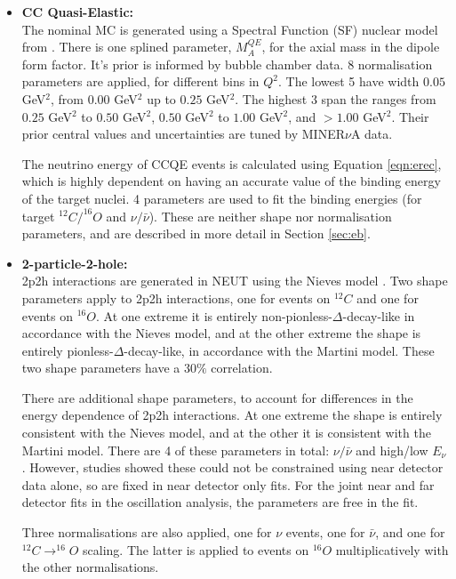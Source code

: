\begin{itemize}

\item \textbf{CC Quasi-Elastic:}\\
The nominal MC is generated using a Spectral Function (SF) nuclear model from \cite{benhar}. There is one splined parameter, $M^{QE}_{A}$, for the axial mass in the dipole form factor. It's prior is informed by bubble chamber data\cite{tn344}. 8 normalisation parameters are applied, for different bins in $Q^2$. The lowest 5 have width $0.05$ GeV$^2$, from $0.00$ GeV$^2$ up to $0.25$ GeV$^2$. The highest 3 span the ranges from $0.25$ GeV$^2$ to $0.50$ GeV$^2$, $0.50$ GeV$^2$ to $1.00$ GeV$^2$, and $>1.00$ GeV$^2$. Their prior central values and uncertainties are tuned by MINER$\nu$A data. 

The neutrino energy of CCQE events is calculated using Equation \ref{eqn:erec}, which is highly dependent on having an accurate value of the binding energy of the target nuclei. 4 parameters are used to fit the binding energies (for target $^{12}C/^{16}O$ and $\nu/\bar{\nu}$). These are neither shape nor normalisation parameters, and are described in more detail in Section \ref{sec:eb}.

\item \textbf{2-particle-2-hole:}\\
2p2h interactions are generated in NEUT using the Nieves model \cite{Nieves}. Two shape parameters apply to 2p2h interactions, one for events on $^{12}C$ and one for events on $^{16}O$.  At one extreme it is entirely non-pionless-$\Delta$-decay-like in accordance with the Nieves model, and at the other extreme the shape is entirely pionless-$\Delta$-decay-like, in accordance with the Martini model\cite{Martini}. These two shape parameters have a 30$\%$ correlation.

There are additional shape parameters, to account for differences in the energy dependence of 2p2h interactions. At one extreme the shape is entirely consistent with the Nieves model, and at the other it is consistent with the Martini model. There are 4 of these parameters in total: $\nu/\bar{\nu}$ and high/low $E_{\nu}$. However, studies showed these could not be constrained using near detector data alone, so are fixed in near detector only fits. For the joint near and far detector fits in the oscillation analysis, the parameters are free in the fit. 

Three normalisations are also applied, one for $\nu$ events, one for $\bar{\nu}$, and one for $^{12}C \rightarrow ^{16}O$ scaling. The latter is applied to events on $^{16}O$ multiplicatively with the other normalisations.


\end{itemize}
